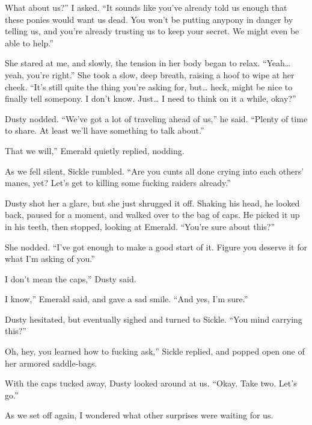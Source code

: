 \leavevmode{}What about us?” I asked. “It sounds like you’ve already told us enough that these ponies would want us dead. You won’t be putting anypony in danger by telling us, and you’re already trusting us to keep your secret. We might even be able to help.”

She stared at me, and slowly, the tension in her body began to relax. “Yeah… yeah, you’re right.” She took a slow, deep breath, raising a hoof to wipe at her cheek. “It’s still quite the thing you’re asking for, but… heck, might be nice to finally tell somepony. I don’t know. Just… I need to think on it a while, okay?”

Dusty nodded. “We’ve got a lot of traveling ahead of us,” he said. “Plenty of time to share. At least we’ll have something to talk about.”

\leavevmode{}That we will,” Emerald quietly replied, nodding.

As we fell silent, Sickle rumbled. “Are you cunts all done crying into each others’ manes, yet? Let’s get to killing some fucking raiders already.”

Dusty shot her a glare, but she just shrugged it off. Shaking his head, he looked back, paused for a moment, and walked over to the bag of caps. He picked it up in his teeth, then stopped, looking at Emerald. “You’re sure about this?”

She nodded. “I’ve got enough to make a good start of it. Figure you deserve it for what I’m asking of you.”

\leavevmode{}I don’t mean the caps,” Dusty said.

\leavevmode{}I know,” Emerald said, and gave a sad smile. “And yes, I’m sure.”

Dusty hesitated, but eventually sighed and turned to Sickle. “You mind carrying this?”

\leavevmode{}Oh, hey, you learned how to fucking ask,” Sickle replied, and popped open one of her armored saddle-bags.

With the caps tucked away, Dusty looked around at us. “Okay. Take two. Let’s go.”

As we set off again, I wondered what other surprises were waiting for us.